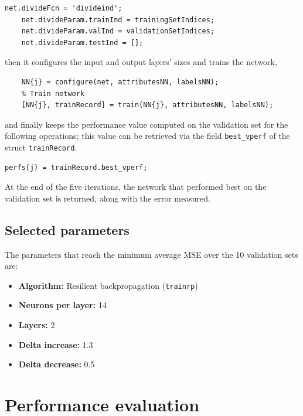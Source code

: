 \documentclass{article}
\begin{document}
\begin{lstlisting}[firstnumber=17]
    net.divideFcn = 'divideind';
    net.divideParam.trainInd = trainingSetIndices;
    net.divideParam.valInd = validationSetIndices;
    net.divideParam.testInd = [];
\end{lstlisting}
then it configures the input and output layers' sizes and trains the network,
\begin{lstlisting}[firstnumber=22]
    % Set up input and output layer
    NN{j} = configure(net, attributesNN, labelsNN);
    % Train network
    [NN{j}, trainRecord] = train(NN{j}, attributesNN, labelsNN);
\end{lstlisting}
and finally keeps the performance value computed on the validation set for the following operations; this value can be retrieved via the field \verb$best_vperf$ of the struct \verb$trainRecord$.
\begin{lstlisting}[firstnumber=30]
    perfs(j) = trainRecord.best_vperf;
\end{lstlisting}
At the end of the five iterations, the network that performed best on the validation set is returned, along with the error measured.

\subsection{Selected parameters}
The parameters that reach the minimum average MSE over the 10 validation sets are:
\begin{itemize}
	\item \textbf{Algorithm:} Resilient backpropagation (\verb$trainrp$)
	\item \textbf{Neurons per layer:} 14
	\item \textbf{Layers:} 2
	\item \textbf{Delta increase:} 1.3
	\item \textbf{Delta decrease:} 0.5
\end{itemize}

\section{Performance evaluation}
\end{document}
